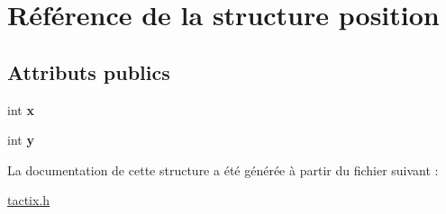\hypertarget{structposition}{\section{Référence de la structure position}
\label{structposition}
}
\subsection*{Attributs publics}
\begin{DoxyCompactItemize}
\item 
\hypertarget{structposition_aad0117268685890818989a6c0112ab8a}{int {\bfseries x}}\label{structposition_aad0117268685890818989a6c0112ab8a}

\item 
\hypertarget{structposition_ab7163210f8aa5e8dc68ef434a315792c}{int {\bfseries y}}\label{structposition_ab7163210f8aa5e8dc68ef434a315792c}

\end{DoxyCompactItemize}


La documentation de cette structure a été générée à partir du fichier suivant \-:\begin{DoxyCompactItemize}
\item 
\hyperlink{tactix_8h}{tactix.\-h}\end{DoxyCompactItemize}
